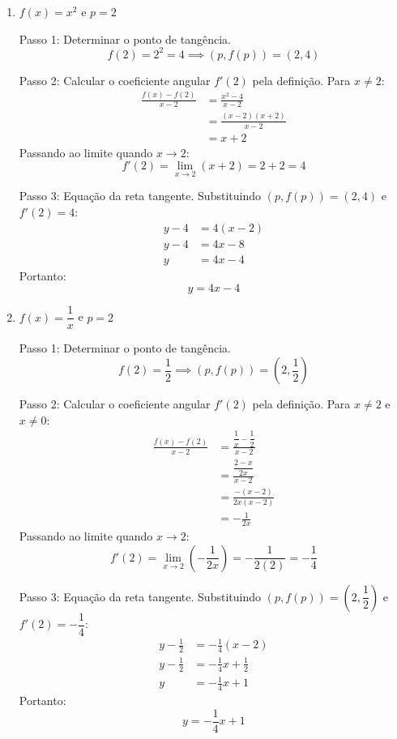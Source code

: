 \vspace{0.4cm}
\begin{enumerate}[label=\alph*)]
    \item $f(x) = x^2$ e $p = 2$
    
    Passo 1: Determinar o ponto de tangência.
    \[
    f(2) = 2^2 = 4 \implies (p, f(p)) = (2, 4)
    \]

    Passo 2: Calcular o coeficiente angular $f'(2)$ pela definição. Para $x \neq 2$:
    \begin{align*}
        \frac{f(x) - f(2)}{x - 2} &= \frac{x^2 - 4}{x - 2} \\[0.20cm]
        &= \frac{(x - 2)(x + 2)}{x - 2} \\[0.20cm]
        &= x + 2
    \end{align*}
    Passando ao limite quando $x \to 2$:
    \[
    f'(2) = \lim_{x \to 2} (x + 2) = 2 + 2 = 4
    \]

    Passo 3: Equação da reta tangente. Substituindo $(p, f(p)) = (2, 4)$ e $f'(2) = 4$:
    \begin{align*}
        y - 4 &= 4(x - 2) \\[0.20cm]
        y - 4 &= 4x - 8 \\[0.20cm]
        y &= 4x - 4
    \end{align*}
    Portanto:
    \[
    y = 4x - 4
    \]

    \item $f(x) = \dfrac{1}{x}$ e $p = 2$
    
    Passo 1: Determinar o ponto de tangência.
    \[
    f(2) = \frac{1}{2} \implies (p, f(p)) = \left(2, \frac{1}{2}\right)
    \]

    Passo 2: Calcular o coeficiente angular $f'(2)$ pela definição. Para $x \neq 2$ e $x \neq 0$:
    \begin{align*}
        \frac{f(x) - f(2)}{x - 2} &= \frac{\dfrac{1}{x} - \dfrac{1}{2}}{x - 2} \\[0.20cm]
        &= \frac{\dfrac{2 - x}{2x}}{x - 2} \\[0.20cm]
        &= \frac{-(x - 2)}{2x(x - 2)} \\[0.20cm]
        &= -\frac{1}{2x}
    \end{align*}
    Passando ao limite quando $x \to 2$:
    \[
    f'(2) = \lim_{x \to 2} \left(-\frac{1}{2x}\right) = -\frac{1}{2(2)} = -\frac{1}{4}
    \]

    Passo 3: Equação da reta tangente. Substituindo $(p, f(p)) = \left(2, \dfrac{1}{2}\right)$ e $f'(2) = -\dfrac{1}{4}$:
    \begin{align*}
        y - \frac{1}{2} &= -\frac{1}{4}(x - 2) \\[0.20cm]
        y - \frac{1}{2} &= -\frac{1}{4}x + \frac{1}{2} \\[0.20cm]
        y &= -\frac{1}{4}x + 1
    \end{align*}
    Portanto:
    \[
    y = -\frac{1}{4}x + 1
    \]


\end{enumerate}
